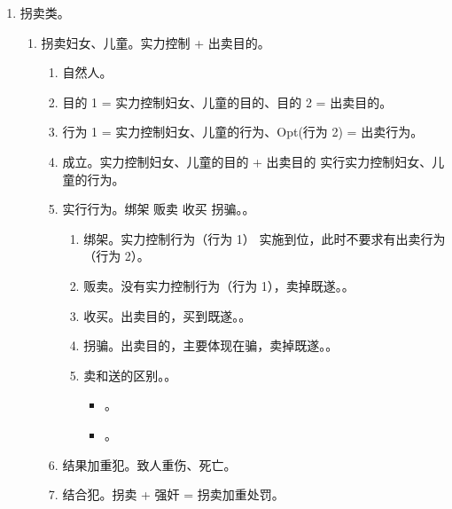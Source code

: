 \begin{enumerate}
\begin{enumerate}
\begin{enumerate}
                \end{enumerate}
          \item {}。。
        \end{enumerate}
  \item 拐卖类。
        \begin{enumerate}
          \item 拐卖妇女、儿童。实力控制 + 出卖目的。
                \begin{enumerate}
                  \item 自然人。
                  \item 目的 1 = 实力控制妇女、儿童的目的、目的 2 = 出卖目的。
                  \item 行为 1 = 实力控制妇女、儿童的行为、Opt(行为 2) = 出卖行为。
                  \item 成立。实力控制妇女、儿童的目的 + 出卖目的 \yjt 实行实力控制妇女、儿童的行为。
                  \item 实行行为。绑架 \dy 贩卖 \dy 收买 \dy 拐骗。。
                        \begin{enumerate}
                          \item 绑架。\yi 实力控制行为（行为 1） 实施到位，此时不要求有出卖行为（行为 2）。
                          \item 贩卖。没有实力控制行为（行为 1），卖掉既遂。。
                          \item 收买。出卖目的，买到既遂。。
                          \item 拐骗。出卖目的，主要体现在骗，卖掉既遂。。
                          \item 卖和送的区别。。
                                \begin{itemize}
                                  \item {}。
                                  \item {}。
                                \end{itemize}
                        \end{enumerate}
                  \item 结果加重犯。致人重伤、死亡。
                  \item 结合犯。拐卖 + 强奸 = 拐卖加重处罚。

\end{enumerate}
\end{enumerate}
\end{enumerate}
